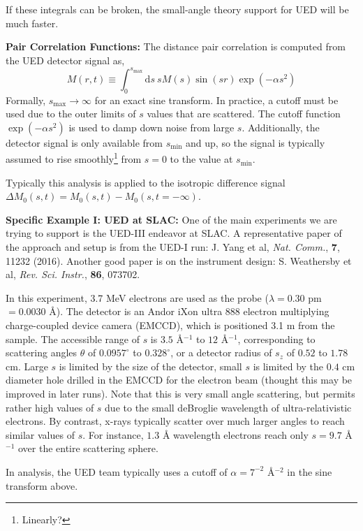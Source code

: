 \documentclass[fleqn,oneside,12pt]{article}
\begin{document}
If these integrals can be broken, the small-angle theory support for UED will be
much faster.

\textbf{Pair Correlation Functions:} The distance pair correlation is computed
from the UED detector signal as,
\[
M (r, t)
\equiv
\int_{0}^{s_{\mathrm{max}}}
\mathrm{d} s \
s M(s)
\sin (sr)
\exp(-\alpha s^2)
\]
Formally, $s_{\mathrm{max}} \rightarrow \infty$ for an exact sine transform. In
practice, a cutoff must be used due to the outer limits of $s$ values that are
scattered. The cutoff function $\exp(-\alpha s^2)$ is used to damp down noise
from large $s$. Additionally, the detector signal is only available from
$s_{\mathrm{min}}$ and up, so the signal is typically assumed to rise
smoothly\footnote{Linearly?} from $s=0$ to the value at $s_{\mathrm{min}}$.

Typically this analysis is applied to the isotropic difference signal $\Delta
M_{0} (s, t) = M_{0} (s, t) - M_{0} (s, t = -\infty)$.

\textbf{Specific Example I: UED at SLAC:} One of the main experiments we are
trying to support is the UED-III endeavor at SLAC. A representative paper of the
approach and setup is from the UED-I run: J. Yang et al, \emph{Nat. Comm.},
\textbf{7}, 11232 (2016). Another good paper is on the instrument design: S.
Weathersby et al, \emph{Rev. Sci. Instr.}, \textbf{86}, 073702. 

In this experiment, 3.7 MeV electrons are used as the probe ($\lambda = 0.30$ pm
$= 0.0030$ \AA{}). The detector is an Andor iXon ultra 888 electron multiplying
charge-coupled device camera (EMCCD), which is positioned 3.1 m from the sample.
The accessible range of $s$ is $3.5$ \AA{}$^{-1}$ to $12$ \AA{}$^{-1}$,
corresponding to scattering angles $\theta$ of $0.0957^{\circ}$ to
$0.328^{\circ}$, or a detector radius of $s_{z}$ of $0.52$ to $1.78$ cm. Large
$s$ is limited by the size of the detector, small $s$ is limited by the $0.4$ cm
diameter hole drilled in the EMCCD for the electron beam (thought this may be
improved in later runs). Note that this is very small angle scattering, but
permits rather high values of $s$ due to the small deBroglie wavelength of
ultra-relativistic electrons. By contrast, x-rays typically scatter over much
larger angles to reach similar values of $s$. For instance, $1.3$ \AA{}
wavelength electrons reach only $s = 9.7$ \AA{}$^{-1}$ over the entire
scattering sphere.

In analysis, the UED team typically uses a cutoff of $\alpha = 7^{-2}$
\AA{}$^{-2}$ in the sine transform above. 
\end{document}
